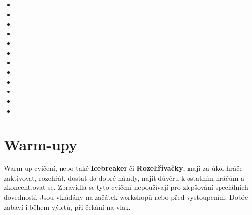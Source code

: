 \begin{multicols}{2}\begin{itemize} 
\item  {}  
\item  {}  
\item  {}  
\item  {}  
\item  {}  
\item  {}  
\item  {}  
\item  {}  
\item  {}  
\item  {}  
\item  {}  
\item  {}  
\end{itemize} 
\end{multicols} 
\needspace{5cm} \section{Warm-upy} \label{warm-upy} Warm-up cvičení, nebo také \textbf{Icebreaker}{} či \textbf{Rozehřívačky}{}, mají za úkol hráče zaktivovat, rozehřát, dostat do dobré nálady, najít důvěru k ostatním hráčům a zkoncentrovat se. Zpravidla se tyto cvičení nepoužívají pro zlepšování speciálních dovedností. Jsou vkládány na začátek workshopů nebo před vystoupením. Dobře zabaví i během výletů, při čekání na vlak. 
 
